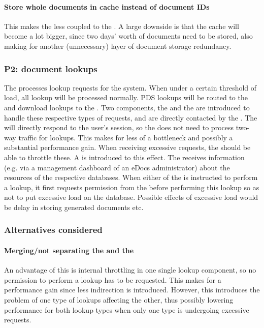 \paragraph{Store whole documents in cache instead of document IDs} This makes the  less coupled to the . A large downside is that the cache will become a lot bigger, since two days' worth of documents need to be stored, also making for another (unnecessary) layer of document storage redundancy.

\subsubsection{P2: document lookups}\label{march:p2}
The  processes lookup requests for the system. When under a certain threshold of load, all lookup will be processed normally. PDS lookups will be routed to the  and download lookups to the . Two components, the  and the  are introduced to handle these respective types of requests, and are directly contacted by the . The  will directly respond to the user's session, so the  does not need to process two-way traffic for lookups. This makes for less of a bottleneck and possibly a substantial performance gain. When receiving excessive requests, the  should be able to throttle these. A  is introduced to this effect. The  receives information (e.g. via a management dashboard of an eDocs administrator) about the resources of the respective databases. When either of the  is instructed to perform a lookup, it first requests permission from the  before performing this lookup so as not to put excessive load on the database. Possible effects of excessive load would be delay in storing generated documents etc.

\subsubsection*{Alternatives considered}
\paragraph{Merging/not separating the  and the } An advantage of this is internal throttling in one single lookup component, so no permission to perform a lookup has to be requested. This makes for a performance gain since less indirection is introduced. However, this introduces the problem of one type of lookups affecting the other, thus possibly lowering performance for both lookup types when only one type is undergoing excessive requests.

